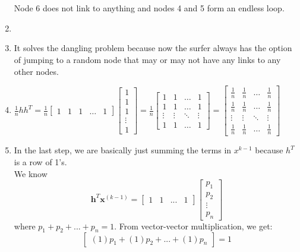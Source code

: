 \documentclass{article}
\begin{document}
\begin{enumerate}
\begin{tikzpicture}[->,>=stealth',shorten >=1pt,auto,node distance=3cm,
	thick,main node/.style={circle,draw,font=\sffamily\Large\bfseries}]
	\end{tikzpicture}
	\\\\
	Node 6 does not link to anything and nodes 4 and 5 form an endless loop.


\item

\item It solves the dangling problem because now the surfer always has the option of jumping to a random node that may or may not have any links to any other nodes. 

\item $ \frac{1}{n}hh^T = \frac{1}{n}
\begin{bmatrix}
1	&1	&1	&\dots	&1
\end{bmatrix}
\begin{bmatrix}
1\\
1\\
1\\
\vdots \\
1
\end{bmatrix}
= \frac{1}{n}
\begin{bmatrix}
1	&1	&\dots	&1\\
1	&1	&\dots	&1\\
\vdots	&\vdots	&\ddots	&\vdots \\
1	&1	&\dots	&1
\end{bmatrix}
= 
\begin{bmatrix}
 \frac{1}{n}	& \frac{1}{n}	&\dots	& \frac{1}{n}\\
 \frac{1}{n}	& \frac{1}{n}	&\dots	& \frac{1}{n}\\
\vdots	&\vdots	&\ddots	&\vdots \\
 \frac{1}{n}	& \frac{1}{n}	&\dots	& \frac{1}{n}
\end{bmatrix} $

\item In the last step, we are basically just summing the terms in $x^{k-1}$ because $h^T$ is a row of 1's.\\
	We know
	$$\textbf{h}^T \textbf{x}^{(k-1)} = \begin{bmatrix} 1 & 1 & ... & 1 \end{bmatrix} \begin{bmatrix} p_1 \\ p_2 \\ \vdots \\ p_n \end{bmatrix}$$
	where $p_1 + p_2 + ... + p_n = 1$. From vector-vector multiplication, we get:
	$$  \begin{bmatrix} (1)p_1 + (1)p_2 + ... + (1)p_n \end{bmatrix} = 1$$ 


\end{enumerate}
\end{document}
